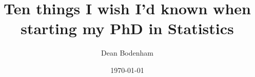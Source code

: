 \documentclass{beamer}
\title{Ten things I wish I'd known when starting my PhD in Statistics}
\author{Dean Bodenham}
\date{\today}
\begin{document}
  \frame{\titlepage}
\end{document}
